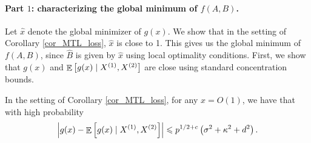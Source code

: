 \paragraph{Part $1$: characterizing the global minimum of $f(A, B)$.}
Let $\hat{x}$ denote the global minimizer of $g(x)$.
We show that in the setting of Corollary \ref{cor_MTL_loss}, $\hat x$ is close to 1.
This gives us the global minimum of $f(A, B)$, since $\hat{B}$ is given by $\hat{x}$ using local optimality conditions.
First, we show that $g(x)$ and $\mathop{\mathbb{E}}\left[ g(x) \mid X^{(1)}, X^{(2)} \right]$ are close using standard concentration bounds.
\begin{claim}\label{claim_largedev1}
 In the setting of Corollary \ref{cor_MTL_loss}, for any $x = O(1)$, we have that with high probability
$$\left| g(x) - \mathop{\mathbb{E}}\left[ g(x) \mid X^{(1)}, X^{(2)}  \right]\right| \leqslant p^{1/2+c} \left(\sigma^2 + \kappa^2+d^2 \right).$$
\end{claim}
